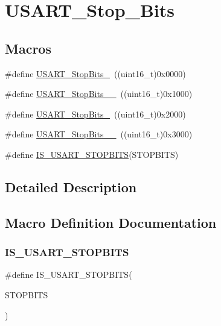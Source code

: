 \hypertarget{group___u_s_a_r_t___stop___bits}{}\section{U\+S\+A\+R\+T\+\_\+\+Stop\+\_\+\+Bits}
\label{group___u_s_a_r_t___stop___bits}
\subsection*{Macros}
\begin{DoxyCompactItemize}
\item 
\#define \mbox{\hyperlink{group___u_s_a_r_t___stop___bits_gae2cb35620ba001f0d63e9e0be93e4a05}{U\+S\+A\+R\+T\+\_\+\+Stop\+Bits\+\_}}~((uint16\+\_\+t)0x0000)
\item 
\#define \mbox{\hyperlink{group___u_s_a_r_t___stop___bits_ga2ad06e3acfb691735d05ab9a314e2e32}{U\+S\+A\+R\+T\+\_\+\+Stop\+Bits\+\_\+\_}}~((uint16\+\_\+t)0x1000)
\item 
\#define \mbox{\hyperlink{group___u_s_a_r_t___stop___bits_ga652058b6be2f48ac0d82d0e75537fc81}{U\+S\+A\+R\+T\+\_\+\+Stop\+Bits\+\_}}~((uint16\+\_\+t)0x2000)
\item 
\#define \mbox{\hyperlink{group___u_s_a_r_t___stop___bits_ga30897cc46d5b3790a9b14ffaba354527}{U\+S\+A\+R\+T\+\_\+\+Stop\+Bits\+\_\+\_}}~((uint16\+\_\+t)0x3000)
\item 
\#define \mbox{\hyperlink{group___u_s_a_r_t___stop___bits_ga6f9153c1fbee1058ba26ec88f0f20828}{I\+S\+\_\+\+U\+S\+A\+R\+T\+\_\+\+S\+T\+O\+P\+B\+I\+TS}}(S\+T\+O\+P\+B\+I\+TS)
\end{DoxyCompactItemize}


\subsection{Detailed Description}


\subsection{Macro Definition Documentation}
\mbox{\label{group___u_s_a_r_t___stop___bits_ga6f9153c1fbee1058ba26ec88f0f20828}} 
\subsubsection{\texorpdfstring{IS\_USART\_STOPBITS}{IS\_USART\_STOPBITS}}
{\footnotesize\ttfamily \#define I\+S\+\_\+\+U\+S\+A\+R\+T\+\_\+\+S\+T\+O\+P\+B\+I\+TS(\begin{DoxyParamCaption}\item[{}]{S\+T\+O\+P\+B\+I\+TS }\end{DoxyParamCaption})}

